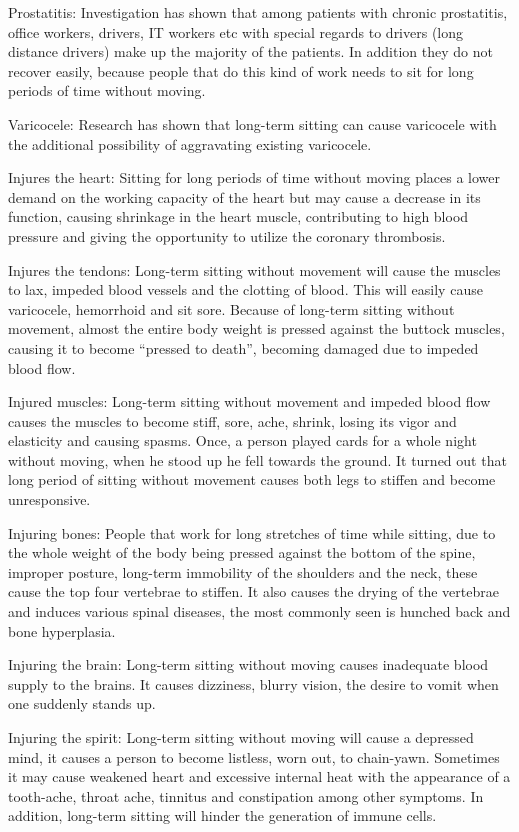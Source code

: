 \documentclass[
]{book}
\begin{document}
Prostatitis: Investigation has shown that among patients with chronic prostatitis, office workers, drivers, IT workers etc with special regards to drivers (long distance drivers) make up the majority of the patients. In addition they do not recover easily, because people that do this kind of work needs to sit for long periods of time without moving.

Varicocele: Research has shown that long-term sitting can cause varicocele with the additional possibility of aggravating existing varicocele.

Injures the heart: Sitting for long periods of time without moving places a lower demand on the working capacity of the heart but may cause a decrease in its function, causing shrinkage in the heart muscle, contributing to high blood pressure and giving the opportunity to utilize the coronary thrombosis.

Injures the tendons: Long-term sitting without movement will cause the muscles to lax, impeded blood vessels and the clotting of blood. This will easily cause varicocele, hemorrhoid and sit sore. Because of long-term sitting without movement, almost the entire body weight is pressed against the buttock muscles, causing it to become ``pressed to death'', becoming damaged due to impeded blood flow.

Injured muscles: Long-term sitting without movement and impeded blood flow causes the muscles to become stiff, sore, ache, shrink, losing its vigor and elasticity and causing spasms. Once, a person played cards for a whole night without moving, when he stood up he fell towards the ground. It turned out that long period of sitting without movement causes both legs to stiffen and become unresponsive.

Injuring bones: People that work for long stretches of time while sitting, due to the whole weight of the body being pressed against the bottom of the spine, improper posture, long-term immobility of the shoulders and the neck, these cause the top four vertebrae to stiffen. It also causes the drying of the vertebrae and induces various spinal diseases, the most commonly seen is hunched back and bone hyperplasia.

Injuring the brain: Long-term sitting without moving causes inadequate blood supply to the brains. It causes dizziness, blurry vision, the desire to vomit when one suddenly stands up.

Injuring the spirit: Long-term sitting without moving will cause a depressed mind, it causes a person to become listless, worn out, to chain-yawn. Sometimes it may cause weakened heart and excessive internal heat with the appearance of a tooth-ache, throat ache, tinnitus and constipation among other symptoms. In addition, long-term sitting will hinder the generation of immune cells.
\end{document}
